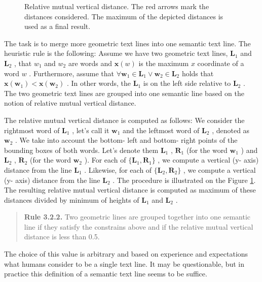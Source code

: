 \documentclass[12pt,a4paper]{report}
\begin{document}
\begin{figure}[htbp]
    \centering
    \caption{Relative mutual vertical distance. The red arrows mark the distances considered. The maximum of the depicted distances is used as a final result.}
    \label{fig:vertical-distance}
\end{figure}

The task is to merge more geometric text lines into one semantic text line. The heuristic rule is the following: Assume we have two geometric text lines, $\mathbf{L}_1$ and $\mathbf{L}_2$ , that $w_1$ and $w_2$ are words and $\mathbf{x}(w)$ is the maximum $x$ coordinate of a word $w$ . Furthermore, assume that $\forall \mathbf{w}_1 \in \mathbf{L}_1 \lor \mathbf{w}_2 \in \mathbf{L}_2$ holds that $\mathbf{x}(\mathbf{w}_1) < \mathbf{x}(\mathbf{w}_2)$ . In other words, the $\mathbf{L}_1$ is on the left side relative to $\mathbf{L}_2$ . The two geometric text lines are grouped into one semantic line based on the notion of relative mutual vertical distance.

The relative mutual vertical distance is computed as follows: We consider the rightmost word of $\mathbf{L}_1$ , let's call it $\mathbf{w}_1$ and the leftmost word of $\mathbf{L}_2$ , denoted as $\mathbf{w}_2$ . We take into account the bottom- left and bottom- right points of the bounding boxes of both words. Let's denote them $\mathbf{L}_1$ , $\mathbf{R}_1$ (for the word $\mathbf{w}_1$ ) and $\mathbf{L}_2$ , $\mathbf{R}_2$ (for the word $\mathbf{w}_2$ ). For each of $\{\mathbf{L}_1, \mathbf{R}_1\}$ , we compute a vertical (y- axis) distance from the line $\mathbf{L}_1$ . Likewise, for each of $\{\mathbf{L}_2, \mathbf{R}_2\}$ , we compute a vertical (y- axis) distance from the line $\mathbf{L}_2$ . The procedure is illustrated on the Figure \ref{fig:vertical-distance}. The resulting relative mutual vertical distance is computed as maximum of these distances divided by minimum of heights of $\mathbf{L}_1$ and $\mathbf{L}_2$ .

\begin{quote}
\textbf{Rule 3.2.2.} Two geometric lines are grouped together into one semantic line if they satisfy the constrains above and if the relative mutual vertical distance is less than 0.5.
\end{quote}

The choice of this value is arbitrary and based on experience and expectations what humans consider to be a single text line. It may be questionable, but in practice this definition of a semantic text line seems to be suffice.
\end{document}

